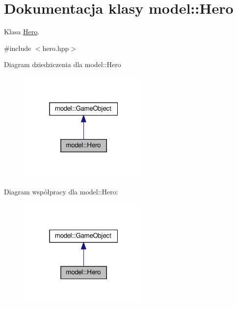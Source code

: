 \hypertarget{classmodel_1_1Hero}{}\section{Dokumentacja klasy model\+:\+:Hero}
\label{classmodel_1_1Hero}


Klasa \hyperlink{classmodel_1_1Hero}{Hero}.  




{\ttfamily \#include $<$hero.\+hpp$>$}



Diagram dziedziczenia dla model\+:\+:Hero\nopagebreak
\begin{figure}[H]
\begin{center}
\leavevmode
\includegraphics[width=184pt]{classmodel_1_1Hero__inherit__graph}
\end{center}
\end{figure}


Diagram współpracy dla model\+:\+:Hero\+:\nopagebreak
\begin{figure}[H]
\begin{center}
\leavevmode
\includegraphics[width=184pt]{classmodel_1_1Hero__coll__graph}
\end{center}
\end{figure}
